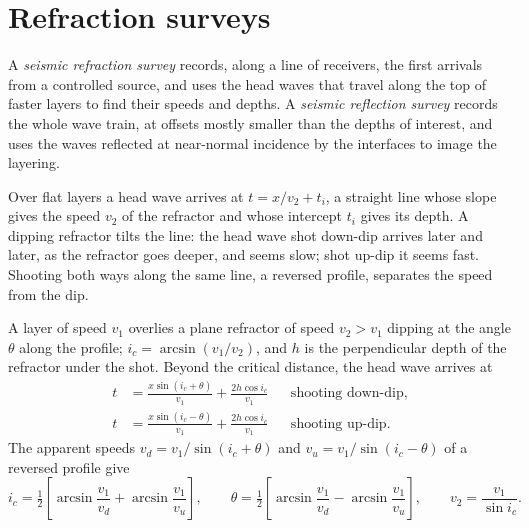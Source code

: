 \section{Refraction surveys}

\begin{definition}\label{def:b3:exploration-seismology:surveys}
A \emph{seismic refraction survey} records, along
a line of receivers, the first arrivals from a controlled source, and uses the
head waves that travel along the top of faster layers to find their speeds and
depths. A \emph{seismic reflection survey}
records the whole wave train, at offsets mostly smaller than the depths of
interest, and uses the waves reflected at near-normal incidence by the
interfaces to image the layering.
\end{definition}

Over flat layers a head wave arrives at $t = x/v_2 + t_i$, a straight line
whose slope gives the speed $v_2$ of the refractor and whose intercept $t_i$
gives its depth. A dipping refractor tilts the line: the head wave shot
down-dip arrives later and later, as the refractor goes deeper, and seems slow;
shot up-dip it seems fast. Shooting both ways along the same line, a reversed
profile, separates the speed from the dip.

\begin{theorem}\label{thm:b3:exploration-seismology:dipping}
A layer of speed $v_1$ overlies a plane refractor of speed $v_2 > v_1$ dipping
at the angle $\theta$ along the profile; $i_c = \arcsin(v_1/v_2)$, and $h$ is the
perpendicular depth of the refractor under the shot. Beyond the critical
distance, the head wave arrives at
\begin{align*}
  t &= \frac{x\sin(i_c + \theta)}{v_1} + \frac{2h\cos i_c}{v_1}
  &&\text{shooting down-dip},\\
  t &= \frac{x\sin(i_c - \theta)}{v_1} + \frac{2h\cos i_c}{v_1}
  &&\text{shooting up-dip}.
\end{align*}
The apparent speeds $v_d = v_1/\sin(i_c + \theta)$ and
$v_u = v_1/\sin(i_c - \theta)$ of a reversed profile give
\[
  i_c = \tfrac12\left[\arcsin\frac{v_1}{v_d} + \arcsin\frac{v_1}{v_u}\right],\qquad
  \theta = \tfrac12\left[\arcsin\frac{v_1}{v_d} - \arcsin\frac{v_1}{v_u}\right],
  \qquad v_2 = \frac{v_1}{\sin i_c} .
\]
\end{theorem}

